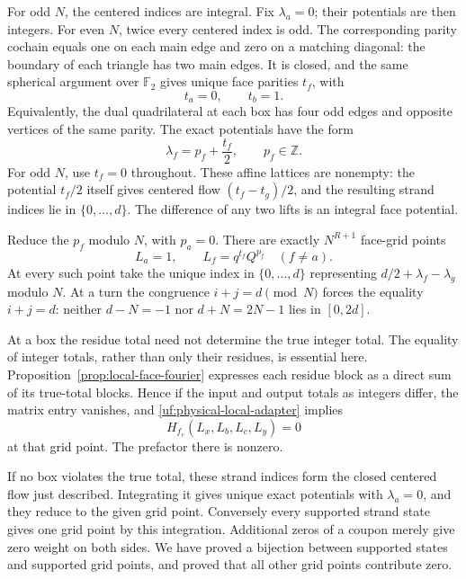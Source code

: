 For odd \(N\), the centered indices are integral. Fix
\(\lambda_a=0\); their potentials are then integers. For even
\(N\), twice every centered index is odd. The corresponding
parity cochain equals one on each main edge and zero on a
matching diagonal: the boundary of each triangle has two
main edges. It is closed, and the same spherical argument over
\(\mathbb F_2\) gives unique face parities \(t_f\), with
\[
 t_a=0,\qquad t_b=1.
\]
Equivalently, the dual quadrilateral at each box has four odd
edges and opposite vertices of the same parity. The exact
potentials have the form
\begin{equation}\label{de:affine-potentials}
                  \lambda_f=p_f+\frac{t_f}{2},
                  \qquad p_f\in\mathbb Z.
\end{equation}
For odd \(N\), use \(t_f=0\) throughout. These affine lattices are
nonempty: the potential \(t_f/2\) itself gives centered flow
\((t_f-t_g)/2\), and the resulting strand indices lie in $\{0,\ldots,d\}$.
The difference of any two lifts is an integral face potential.

Reduce the \(p_f\) modulo \(N\), with \(p_a=0\). There are exactly
\(N^{R+1}\) face-grid points
\begin{equation}\label{de:face-grid}
 L_a=1,\qquad L_f=q^{t_f}Q^{p_f}\quad(f\ne a).
\end{equation}
At every such point take the unique index in $\{0,\ldots,d\}$ representing
\(d/2+\lambda_f-\lambda_g\) modulo \(N\). At a turn the
congruence \(i+j=d\pmod N\) forces the equality \(i+j=d\):
neither \(d-N=-1\) nor \(d+N=2N-1\) lies in \([0,2d]\).

At a box the residue total need not determine the true integer
total. The equality of integer totals, rather than only their residues, is essential here.
Proposition~\ref{prop:local-face-fourier} expresses each residue
block as a direct sum of its true-total blocks. Hence if the
input and output totals as integers differ, the matrix entry
vanishes, and \eqref{uf:physical-local-adapter} implies
\begin{equation}\label{de:unsupported-zero}
                    H_{f_e}(L_x,L_b,L_c,L_y)=0
\end{equation}
at that grid point. The prefactor there is nonzero.

If no box violates the true total, these strand indices form the
closed centered flow just described. Integrating it gives unique
exact potentials with \(\lambda_a=0\), and they reduce to the
given grid point. Conversely every supported strand state
gives one grid point by this integration. Additional zeros of
a coupon merely give zero weight on both sides. We have proved
a bijection between supported states and supported grid points,
and proved that all other grid points contribute zero.

